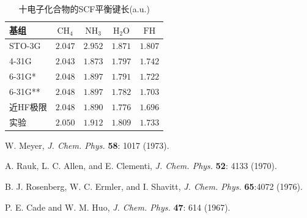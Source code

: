 \begin{table}\centering
	\caption{十电子化合物的SCF平衡键长(a.u.)}
	\begin{threeparttable}
		\begin{tabular}{lcccc}
			\hline 基组 & $\mathrm{CH}_4$ & $\mathrm{NH}_3$ & $\mathrm{H}_2 \mathrm{O}$ & $\mathrm{FH}$ \\
			\hline STO-3G & $2.047$ & $2.952$ & $1.871$ & $1.807$ \\
			4-31G & $2.043$ & $1.873$ & $1.797$ & $1.742$ \\
			6-31G* & $2.048$ & $1.897$ & $1.791$ & $1.722$ \\
			6-31G** & $2.048$ & $1.897$ & $1.782$ & $1.703$ \\
			近HF极限 & $2.048$\tnote{a} & $1.890$\tnote{b} & $1.776$\tnote{c} & $1.696$\tnote{d} \\
                        实验 & $2.050$ & $1.912$ & $1.809$ & $1.733$ \\
			\hline
		\end{tabular}
		\begin{tablenotes}
			\item[a] W. Meyer, \textit{J. Chem. Phys.} \textbf{58}: 1017 (1973).
			\item[b] A. Rauk, L. C. Allen, and E. Clementi, \textit{J. Chem. Phys.} \textbf{52}: 4133 (1970).
			\item[c] B. J. Rosenberg, W. C. Ermler, and I. Shavitt, \textit{J. Chem. Phys.} \textbf{65}:4072 (1976).
			\item[d] P. E. Cade and W. M. Huo, \textit{J. Chem. Phys.} \textbf{47}: 614 (1967).
		\end{tablenotes}
	\end{threeparttable}
	\label{tab:3.20}
\end{table}

